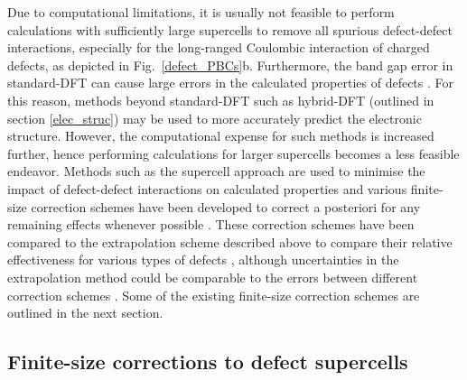 \documentclass[11pt, twoside]{report}
\begin{document}
Due to computational limitations, it is usually not feasible to perform calculations with sufficiently large supercells to remove all spurious defect-defect interactions, especially for the long-ranged Coulombic interaction of charged defects, as depicted in Fig.~\ref{defect_PBCs}b.
Furthermore, the band gap error in standard-DFT can cause large errors in the calculated properties of defects \cite{Lany_defects, hybrids_defect_calcs}. For this reason, methods beyond standard-DFT such as hybrid-DFT (outlined in section \ref{elec_struc}) may be used to more accurately predict the electronic structure. However, the computational expense for such methods is increased further, hence performing calculations for larger supercells becomes a less feasible endeavor.
Methods such as the supercell approach are used to minimise the impact of defect-defect interactions on calculated properties and various finite-size correction schemes have been developed to correct a posteriori for any remaining effects whenever possible \cite{freysoldt_rev}. These correction schemes have been compared to the extrapolation scheme described above to compare their relative effectiveness for various types of defects \cite{komsa}, although uncertainties in the extrapolation method could be comparable to the errors between different correction schemes \cite{Durrant_defects}. Some of the existing finite-size correction schemes are outlined in the next section. 

\subsection{Finite-size corrections to defect supercells}
\end{document}
